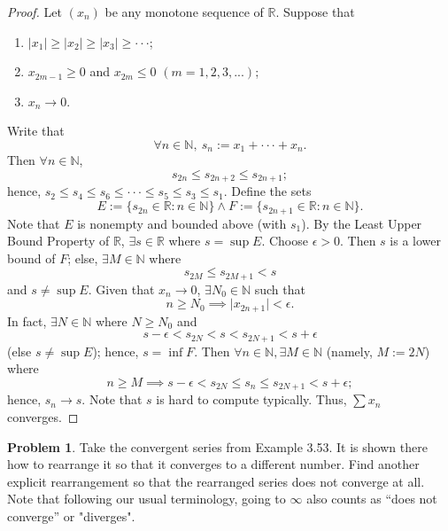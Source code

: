 \documentclass{amsart}
\theoremstyle{definition}
\newtheorem{problem}{Problem}
\begin{document}
\begin{proof}
    Let $(x_n)$ be any monotone sequence of $\mathbb{R}$. Suppose that 
    \begin{enumerate}[label=(\alph*)]
        \item $\vert x_1 \vert \geq \vert x_2 \vert \geq \vert x_3 \vert \geq \cdot \cdot \cdot$; 
        \item $x_{2m-1} \geq 0$ and $x_{2m} \leq 0$ $(m = 1,2,3,...)$;
        \item $x_n \to 0$.
    \end{enumerate}
    Write that
    \[
    \forall n \in \mathbb{N}, \ s_n := x_1 + \cdot \cdot \cdot + x_n.
    \]
    Then $\forall n \in \mathbb{N}$,
    \[
    s_{2n} \leq s_{2n+2} \leq s_{2n+1};
    \]
    hence, $s_2 \leq s_4 \leq s_6 \leq \cdot \cdot \cdot \leq s_5 \leq s_3 \leq s_1$.
    Define the sets
    \[
    E := \{s_{2n} \in \mathbb{R} : n \in \mathbb{N}\} \land F := \{s_{2n+1} \in \mathbb{R} : n \in \mathbb{N}\}.
    \]
    Note that $E$ is nonempty and bounded above (with $s_1$). By the Least Upper Bound Property of $\mathbb{R}$, $\exists s \in \mathbb{R}$ where $s = \sup E$. Choose $\epsilon > 0$. Then $s$ is a lower bound of $F$; else, $\exists M \in \mathbb{N}$ where 
    \[
    s_{2M} \leq s_{2M+1} < s
    \]
    and $s \neq \sup E$. Given that $x_n \to 0$, $\exists N_0 \in \mathbb{N}$ such that 
    \[
    n \geq N_0 \implies \vert x_{2n+1} \vert < \epsilon.
    \]
    In fact, $\exists N \in \mathbb{N}$ where $N \geq N_0$ and 
    \[
    s - \epsilon < s_{2N} < s < s_{2N+1} < s + \epsilon
    \]
    (else $s \neq \sup E$); hence, $s = \inf F$. Then $\forall n \in \mathbb{N}, \exists M \in \mathbb{N}$ (namely, $M := 2N$) where 
    \[
    n \geq M \implies s - \epsilon < s_{2N} \leq s_n \leq s_{2N+1} < s + \epsilon; 
    \]
    hence, $s_n \to s$. Note that $s$ is hard to compute typically. Thus, $\sum x_n$ converges.
\end{proof}

\begin{problem}
    Take the convergent series from Example 3.53. It is shown there how to rearrange it so that it converges to a diﬀerent number. Find another explicit rearrangement so that the rearranged series does not converge at all. Note that following our usual terminology, going to $\infty$ also counts as “does not converge” or "diverges".
\end{problem}
\end{document}
